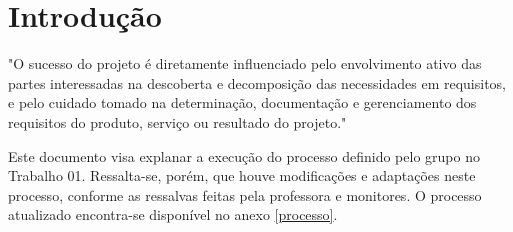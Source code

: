 \chapter*[Introdução]{Introdução}

"O sucesso do projeto é diretamente influenciado pelo envolvimento ativo das partes interessadas na
descoberta e decomposição das necessidades em requisitos, e pelo cuidado tomado na determinação,
documentação e gerenciamento dos requisitos do produto, serviço ou resultado do projeto." \cite{pmbok}

Este documento visa explanar a execução do processo definido pelo grupo no Trabalho 01. Ressalta-se,
porém, que houve modificações e adaptações neste processo, conforme as ressalvas feitas pela professora e monitores.
O processo atualizado encontra-se disponível no anexo \ref{processo}.
